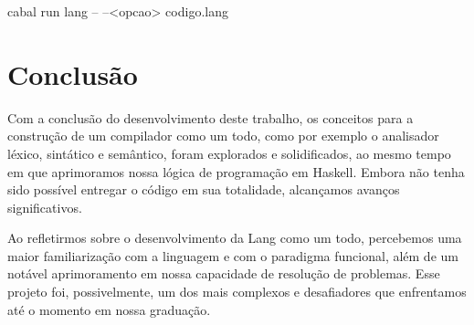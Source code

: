 \documentclass{article}
\begin{document}
    \begin{tcolorbox}[title=Execução do interpretador, width=\linewidth, fontupper=\ttfamily,  halign=flush left, label = box:recursive]
      cabal run lang -- --<opcao> codigo.lang
    \end{tcolorbox}

    
\section{Conclusão}
    Com a conclusão do desenvolvimento deste trabalho, os conceitos para a construção de um compilador como um todo, como por exemplo o analisador léxico, sintático e semântico, foram explorados e solidificados, ao mesmo tempo em que aprimoramos nossa lógica de programação em Haskell. Embora não tenha sido possível entregar o código em sua totalidade, alcançamos avanços significativos.

    Ao refletirmos sobre o desenvolvimento da Lang como um todo, percebemos uma maior familiarização com a linguagem e com o paradigma funcional, além de um notável aprimoramento em nossa capacidade de resolução de problemas. Esse projeto foi, possivelmente, um dos mais complexos e desafiadores que enfrentamos até o momento em nossa graduação.

\newpage
\end{document}
